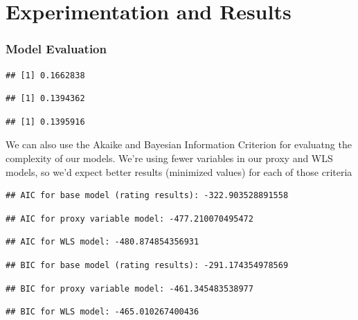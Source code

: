 \documentclass[
  man,floatsintext]{apa6}
\begin{document}
\hypertarget{experimentation-and-results}{%
\section{Experimentation and Results}\label{experimentation-and-results}}

\hypertarget{model-evaluation}{%
\subsubsection{Model Evaluation}\label{model-evaluation}}

\begin{verbatim}
## [1] 0.1662838
\end{verbatim}

\begin{verbatim}
## [1] 0.1394362
\end{verbatim}

\begin{verbatim}
## [1] 0.1395916
\end{verbatim}

We can also use the Akaike and Bayesian Information Criterion for evaluatng the complexity of our models. We're using fewer variables in our proxy and WLS models, so we'd expect better results (minimized values) for each of those criteria

\begin{verbatim}
## AIC for base model (rating results): -322.903528891558
\end{verbatim}

\begin{verbatim}
## AIC for proxy variable model: -477.210070495472
\end{verbatim}

\begin{verbatim}
## AIC for WLS model: -480.874854356931
\end{verbatim}

\begin{verbatim}
## BIC for base model (rating results): -291.174354978569
\end{verbatim}

\begin{verbatim}
## BIC for proxy variable model: -461.345483538977
\end{verbatim}

\begin{verbatim}
## BIC for WLS model: -465.010267400436
\end{verbatim}
\end{document}
